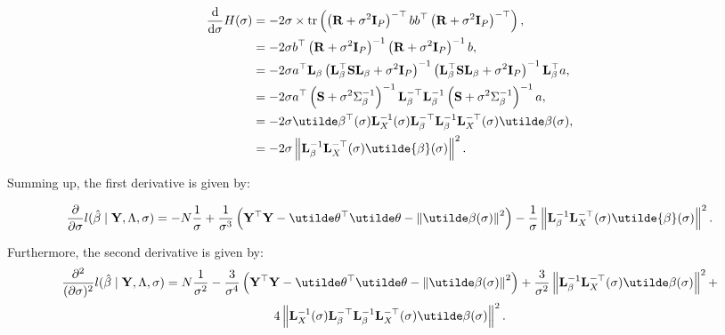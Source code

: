 \documentclass[10pt]{article}
\begin{document}
\begin{align*}
\frac{\mathrm{d}}{\mathrm{d}\sigma}
H(\sigma) & = -2\sigma\times \mathrm{tr}\left(\left({\bf
    R} + \sigma^2{\bf I}_P\right)^{-\top}b b^\top \left({\bf
    R} + \sigma^2{\bf I}_P\right)^{-\top}\right), \\
& = -2\sigma b^\top \left({\bf
    R} + \sigma^2{\bf I}_P\right)^{-1} \left({\bf
    R} + \sigma^2{\bf I}_P\right) ^{-1} b, \\
& = -2\sigma a^\top {\bf L}_\beta\left({\bf L}_\beta^\top{\bf S}{\bf
    L}_\beta + \sigma^2{\bf I}_P\right)^{-1}\left({\bf L}_\beta^\top{\bf S}{\bf
    L}_\beta + \sigma^2{\bf I}_P\right)^{-1}{\bf L}_\beta^\top a, \\
& = -2\sigma a^\top\left({\bf S} +
  \sigma^2\Sigma_\beta^{-1}\right)^{-1} {\bf L}_\beta^{-\top}{\bf
  L}_\beta^{-1} \left({\bf S} +
  \sigma^2\Sigma_\beta^{-1}\right)^{-1} a, \\
& = -2\sigma \utilde\beta^\top(\sigma){\bf L}_X^{-1}(\sigma){\bf
  L}_\beta^{-\top} {\bf L}_\beta^{-1} {\bf L}_X^{-\top}(\sigma)
\utilde\beta(\sigma), \\
& = -2\sigma \left\|{\bf L}_\beta^{-1}{\bf
  L}_X^{-\top}(\sigma)\utilde{\beta}(\sigma) \right\|^2.
\end{align*}

Summing up, the first derivative is given by:

\begin{equation*}
\frac{\partial}{\partial\sigma} l(\hat\beta \mid {\bf Y}, \Lambda,
\sigma ) = -N\frac{1}{\sigma} + \frac{1}{\sigma^3}\left({\bf Y}^\top{\bf
    Y}-\utilde\theta^\top\utilde\theta
  -\left\|\utilde\beta(\sigma)\right\|^2\right) -
\frac{1}{\sigma}\left\|{\bf L}_\beta^{-1}{\bf
  L}_X^{-\top}(\sigma)\utilde{\beta}(\sigma) \right\|^2.
\end{equation*}

Furthermore, the second derivative is given by:
\begin{multline*}
\frac{\partial^2}{(\partial\sigma)^2}
l(\hat\beta \mid {\bf Y}, \Lambda, \sigma) =
N \frac{1}{\sigma^2} - \frac{3}{\sigma^4} \left({\bf Y}^\top{\bf
    Y}-\utilde\theta^\top\utilde\theta
  -\left\|\utilde\beta(\sigma)\right\|^2\right) +
\frac{3}{\sigma^2}\left\| {\bf L}_\beta^{-1}{\bf
    L}_X^{-\top}(\sigma)\utilde\beta(\sigma) \right\|^2 + \\
4\left\| {\bf L}_X^{-1}(\sigma){\bf L}_\beta^{-\top} {\bf L}_\beta^{-1}{\bf
    L}_X^{-\top}(\sigma)\utilde\beta(\sigma) \right\|^2.
\end{multline*}
\end{document}
